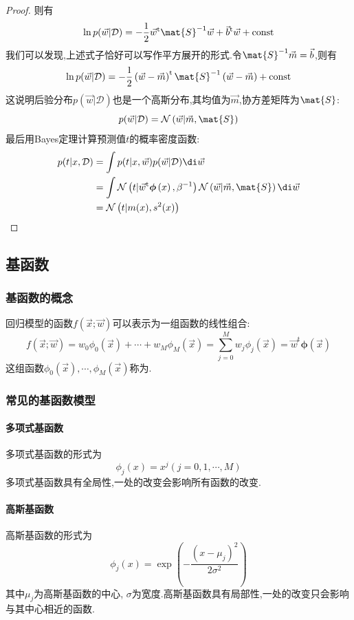\documentclass{ctexart}
\begin{document}
\begin{proof}
    则有
    \[\ln p(\vec{w}|\mathcal{D})=-\dfrac{1}{2}\vec{w}^\text{t}\mat{S}^{-1}\vec{w}+\vec{b}^\text{t}\vec{w}+\text{const}\]
    我们可以发现,上述式子恰好可以写作平方展开的形式.令$\mat{S}^{-1}\vec{m}=\vec{b}$,则有
    \[\ln p(\vec{w}|\mathcal{D})=-\dfrac12\left(\vec{w}-\vec{m}\right)^{\mathrm{t}}\mat{S}^{-1}\left(\vec{w}-\vec{m}\right)+\text{const}\]
    这说明后验分布$p(\vec{w}|\mathcal{D})$也是一个高斯分布,其均值为$\vec{m}$,协方差矩阵为$\mat{S}$:
    \[p(\vec{w}|\mathcal{D})=\mathcal{N}\left(\vec{w}|\vec{m},\mat{S}\right)\]
    最后用Bayes定理计算预测值$t$的概率密度函数:
    \[\begin{aligned}
        p(t|x,\mathcal{D})
        &= \int p(t|x,\vec{w})p(\vec{w}|\mathcal{D})\di\vec{w} \\
        &= \int \mathcal{N}\left(t|\vec{w}^{\mathrm{t}}\boldsymbol{\phi}\left(x\right),\beta^{-1}\right)\mathcal{N}\left(\vec{w}|\vec{m},\mat{S}\right)\di\vec{w} \\
        &= \mathcal{N}\left(t|m(x),s^2(x)\right)
    \end{aligned}\]
\end{proof}
\subsection{基函数}
\subsubsection{基函数的概念}
\begin{definition}[基函数]
    回归模型的函数$f\left(\vec{x};\vec{w}\right)$可以表示为一组函数的线性组合:
    \[f\left(\vec{x};\vec{w}\right)=w_0\phi_0\left(\vec{x}\right)+\cdots+w_M\phi_M\left(\vec{x}\right)
    =\sum_{j=0}^{M}w_j\phi_j\left(\vec{x}\right)=\vec{w}^{\text{t}}\boldsymbol{\phi}\left(\vec{x}\right)\]
    这组函数$\phi_0\left(\vec{x}\right),\cdots,\phi_M\left(\vec{x}\right)$称为.
\end{definition}
\subsubsection{常见的基函数模型}
\paragraph{多项式基函数}
多项式基函数的形式为
\[\phi_j\left(x\right)=x^j(j=0,1,\cdots,M)\]
多项式基函数具有全局性,一处的改变会影响所有函数的改变.
\paragraph{高斯基函数}
高斯基函数的形式为
\[\phi_j\left(x\right)=\exp\left(-\dfrac{\left(x-\mu_j\right)^2}{2\sigma^2}\right)\]
其中$\mu_j$为高斯基函数的中心, $\sigma$为宽度.高斯基函数具有局部性,一处的改变只会影响与其中心相近的函数.
\end{document}
